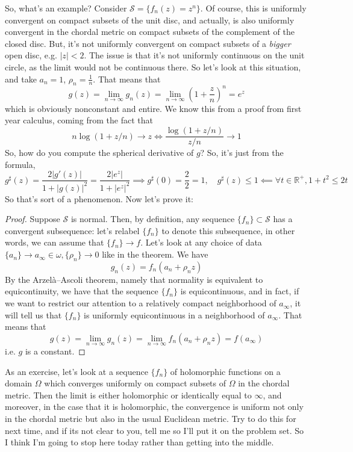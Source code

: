 \documentclass{article}
\newcommand{\mbb}[1]{\mathbb{#1}}
\newcommand{\mc}[1]{\mathcal{#1}}
\newcommand{\reals}{\mbb{R}}
\begin{document}
So, what's an example? Consider \(\mc{S} = \{f_n(z) = z^n\}\). Of course, this is uniformly convergent on compact subsets of the unit disc, and actually, is also uniformly convergent in the chordal metric on compact subsets of the complement of the closed disc. But, it's not uniformly convergent on compact subsets of a \textit{bigger} open disc, e.g. \(|z| < 2\). The issue is that it's not uniformly continuous on the unit circle, as the limit would not be continuous there. So let's look at this situation, and take \(a_n = 1\), \(\rho_n = \frac{1}{n}\). That means that
\[g(z) = \lim_{n \to \infty}g_n(z) = \lim_{n \to \infty}\left(1 + \frac{z}{n}\right)^n = e^z\]
which is obviously nonconstant and entire. We know this from a proof from first year calculus, coming from the fact that
\[n\log(1 + z/n) \to z \iff \frac{\log(1 + z/n)}{z/n} \to 1\]
So, how do you compute the spherical derivative of \(g\)? So, it's just from the formula,
\[g^\sharp(z) = \frac{2|g'(z)|}{1 + |g(z)|^2} = \frac{2|e^z|}{1 + |e^z|^2} \implies g^\sharp(0) = \frac{2}{2} = 1, \quad g^\sharp(z) \leq 1 \impliedby \forall t \in \reals^+, 1 + t^2 \leq 2t\]
So that's sort of a phenomenon. Now let's prove it:
\begin{proof}
Suppose \(\mc{S}\) is normal. Then, by definition, any sequence \(\{f_n\} \subset \mc{S}\) has a convergent subsequence: let's relabel \(\{f_n\}\) to denote this subsequence, in other words, we can assume that \(\{f_n\} \to f\). Let's look at any choice of data \(\{a_n\} \to a_\infty \in \omega, \{\rho_n\} \to 0\) like in the theorem. We have
\[g_n(z) = f_n(a_n + \rho_nz)\]
By the Arzelà–Ascoli theorem, namely that normality is equivalent to equicontinuity, we have that the sequence \(\{f_n\}\) is equicontinuous, and in fact, if we want to restrict our attention to a relatively compact neighborhood of \(a_\infty\), it will tell us that \(\{f_n\}\) is uniformly equicontinuous in a neighborhood of \(a_\infty\). That means that
\[g(z) = \lim_{n \to \infty}g_n(z) = \lim_{n \to \infty}f_n(a_n + \rho_nz) = f(a_\infty)\]
i.e. \(g\) is a constant.
\end{proof}

As an exercise, let's look at a sequence \(\{f_n\}\) of holomorphic functions on a domain \(\Omega\) which converges uniformly on compact subsets of \(\Omega\) in the chordal metric. Then the limit is either holomorphic or identically equal to \(\infty\), and moreover, in the case that it is holomorphic, the convergence is uniform not only in the chordal metric but also in the usual Euclidean metric. Try to do this for next time, and if its not clear to you, tell me so I'll put it on the problem set. So I think I'm going to stop here today rather than getting into the middle.
\end{document}
